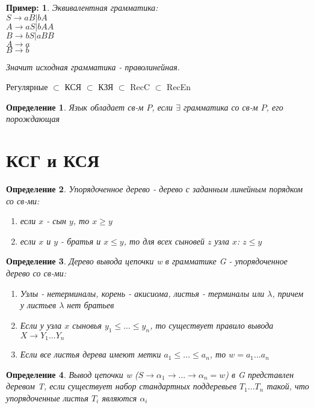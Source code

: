 \documentclass[11pt]{article}
\newtheorem*{df}{Определение}
\theoremstyle{break}
\newtheorem*{example}{Пример:}
\begin{document}
\begin{sloppypar}
\begin{example}
Эквивалентная грамматика: \\
$S \rightarrow aB|bA$ \\
$A \rightarrow aS|bAA$ \\
$B \rightarrow bS|aBB$ \\
$A \rightarrow a$ \\
$B \rightarrow b$

Значит исходная грамматика - праволинейная.
\end{example}

Регулярные $\subset$ КСЯ $\subset$ КЗЯ $\subset$ RecC $\subset$ RecEn

\begin{df}
	Язык обладает св-м $P$, если $\exists$ грамматика со св-м $P$, его порождающая
\end{df}

\section*{КСГ и КСЯ}
\begin{df}
 Упорядоченное дерево - дерево с заданным линейным порядком со св-ми:
 \begin{enumerate}
  \item если $x$ - сын $y$, то $x \geq y$
  \item если $x$ и $y$ - братья и $x \leq y$, то для всех сыновей $z$ узла $x$: $z \leq y$
 \end{enumerate}
\end{df}

\begin{df}
 Дерево вывода цепочки w в грамматике G - упорядоченное дерево со св-ми:
 \begin{enumerate}
  \item Узлы - нетерминалы, корень - акисиома, листья - терминалы или $\lambda$, причем у листьев $\lambda$ нет братьев

  \item Если у узла $x$ сыновья $y_1 \leq ... \leq y_n$, то существует правило вывода $X \rightarrow Y_1...Y_n$

  \item Если все листья дерева имеют метки $a_1 \leq ... \leq a_n$, то $w = a_1...a_n$
 \end{enumerate}
\end{df}

\begin{df}
 Вывод цепочки w ($S \rightarrow \alpha_1 \rightarrow ... \rightarrow \alpha_n = w$) в G представлен деревом T, если существует набор стандартных поддеревьев $T_1 ... T_n$ такой, что упорядоченные листья $T_i$ являются $\alpha_i$
\end{df}


\end{sloppypar}
\end{document}
